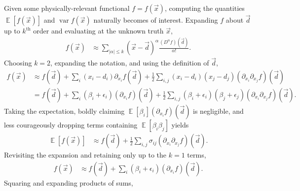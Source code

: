 \documentclass[letterpaper,11pt,nointlimits,reqno,draft]{amsbook}
\newcommand{\expect}[1]{\operatorname{\mathbb{E}}\left[#1\right]}
\begin{document}
Given some physically-relevant functional $f = f\left(\vec{x}\right)$,
computing the quantities $\expect{f\left(\vec{x}\right)}$ and
$\operatorname{var} f\left(\vec{x}\right) $ naturally becomes of interest.
Expanding $f$ about $\vec{d}$ up to $k^\mathrm{th}$ order and evaluating at the
unknown truth $\vec{x}$,
\begin{align*}
  f(\vec{x})
&\approx
  \sum_{|\alpha| \le k} \left( \vec{x} - \vec{d} \right)^\alpha
  \frac{\left(D^\alpha f\right)\left(\vec{d}\right)}{\alpha!}
.
\end{align*}
Choosing $k=2$, expanding the notation, and using the definition of $\vec{d}$,
\begin{align*}
  f\left(\vec{x}\right)
&\approx
    f\left(\vec{d}\right)
  + \sum_i \left(x_i-d_i\right) \partial_{x_i} f\left(\vec{d}\right)
  + \frac{1}{2} \sum_{i,j}
                \left(x_i-d_i\right)\left(x_j-d_j\right)
                \left(\partial_{x_i} \partial_{x_j} f\right)\left(\vec{d}\right)
\\
&=
    f\left(\vec{d}\right)
  + \sum_i \left(\beta_i+\epsilon_i\right)
           \left(\partial_{x_i} f\right)\left(\vec{d}\right)
  + \frac{1}{2} \sum_{i,j}
                \left(\beta_i+\epsilon_i\right)
                \left(\beta_j+\epsilon_j\right)
                \left(\partial_{x_i} \partial_{x_j} f\right)\left(\vec{d}\right)
.
\end{align*}
Taking the expectation, boldly claiming $\expect{\beta_i}\left(\partial_{x_i}
f\right)\left(\vec{d}\right)$ is negligible, and less courageously dropping
terms containing $\expect{\beta_i \beta_j}$ yields
\begin{align*}
  \expect{f\left(\vec{x}\right)}
&\approx
    f\left(\vec{d}\right)
  + \frac{1}{2} \sum_{i,j}
                \sigma_{ij}
                \left(\partial_{x_i} \partial_{x_j} f\right)\left(\vec{d}\right)
.
\end{align*}
Revisiting the expansion and retaining only up to the $k=1$ terms,
\begin{align*}
  f\left(\vec{x}\right)
&\approx
    f\left(\vec{d}\right)
  + \sum_i \left(\beta_i+\epsilon_i\right)
           \left(\partial_{x_i} f\right)\left(\vec{d}\right)
.
\end{align*}
Squaring and expanding products of sums,
\end{document}

